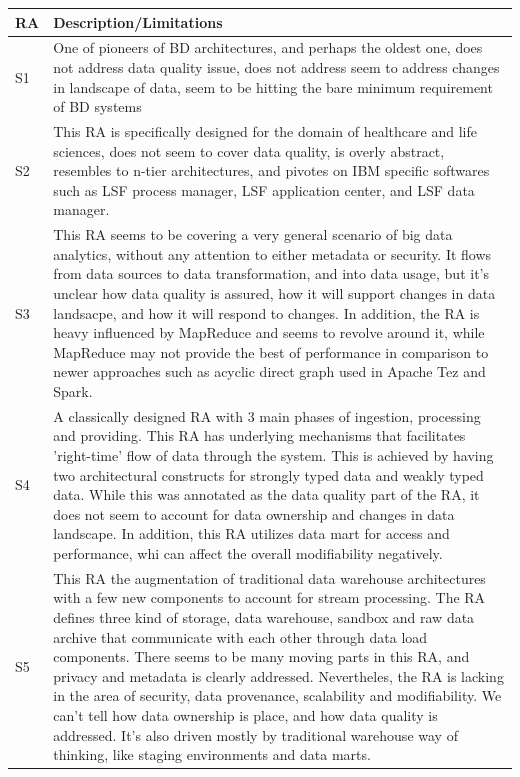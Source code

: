 \documentclass[review]{elsarticle}
\begin{document}
\begin{longtable}{|p{0.5cm}|p{11cm}|}
        \hline
        RA & Description/Limitations \\ 
        \hline
        S1 & One of pioneers of BD architectures, and perhaps the oldest one, does not address data quality issue, does not address seem to address changes in landscape of data, seem to be hitting the bare minimum requirement of BD systems  \\
        \hline
        S2 & This RA is specifically designed for the domain of healthcare and life sciences, does not seem to cover data quality, is overly abstract, resembles to n-tier architectures, and pivotes on IBM specific softwares such as LSF process manager, LSF application center, and LSF data manager. \\
        \hline
        S3 & This RA seems to be covering a very general scenario of big data analytics, without any attention to either metadata or security. It flows from data sources to data transformation, and into data usage, but it's unclear how data quality is assured, how it will support changes in data landsacpe, and how it will respond to changes. In addition, the RA is heavy influenced by MapReduce and seems to revolve around it, while MapReduce may not provide the best of performance in comparison to newer approaches such as acyclic direct graph used in Apache Tez and Spark.  \\
        \hline
        S4 & A classically designed RA with 3 main phases of ingestion, processing and providing. This RA has underlying mechanisms that facilitates 'right-time' flow of data through the system. This is achieved by having two architectural constructs for strongly typed data and weakly typed data. While this was annotated as the data quality part of the RA, it does not seem to account for data ownership and changes in data landscape. In addition, this RA utilizes data mart for access and performance, whi can affect the overall modifiability negatively.   \\
        \hline
        S5 & This RA the augmentation of traditional data warehouse architectures with a few new components to account for stream processing. The RA defines three kind of storage, data warehouse, sandbox and raw data archive that communicate with each other through data load components. There seems to be many moving parts in this RA, and privacy and metadata is clearly addressed. Nevertheles, the RA is lacking in the area of security, data provenance, scalability and modifiability. We can't tell how data ownership is place, and how data quality is addressed. It's also driven mostly by traditional warehouse way of thinking, like staging environments and data marts.  \\

\end{longtable}
\end{document}
